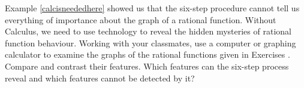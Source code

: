 {\noindent Example \ref{calcisneededhere} showed us that the six-step procedure cannot tell us everything of importance about the graph of a rational function.  Without Calculus, we need to use technology to reveal the hidden mysteries of rational function behaviour.  Working with your classmates, use a computer or graphing calculator to examine the graphs of the rational functions given in Exercises}
{.  Compare and contrast their features.  Which features can the six-step process reveal and which features cannot be detected by it?}

